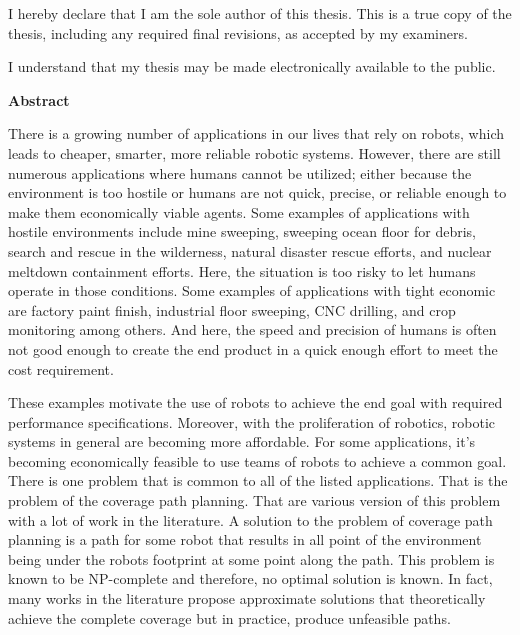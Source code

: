 \cleardoublepage %
 


  \noindent
I hereby declare that I am the sole author of this thesis. This is a true copy of the thesis, including any required final revisions, as accepted by my examiners.

  \bigskip
  
  \noindent
I understand that my thesis may be made electronically available to the public.

\cleardoublepage


\begin{center}\textbf{Abstract}\end{center}
There is a growing number of applications in our lives that rely on robots, which leads to cheaper, smarter, more reliable robotic systems. However, there are still numerous applications where humans cannot be utilized; either because the environment is too hostile or humans are not quick, precise, or reliable enough to make them economically viable agents. Some examples of applications with hostile environments include mine sweeping, sweeping ocean floor for debris, search and rescue in the wilderness, natural disaster rescue efforts, and nuclear meltdown containment efforts. Here, the situation is too risky to let humans operate in those conditions. Some examples of applications with tight economic are factory paint finish, industrial floor sweeping, CNC drilling, and crop monitoring among others. And here, the speed and precision of humans is often not good enough to create the end product in a quick enough effort to meet the cost requirement.

These examples motivate the use of robots to achieve the end goal with required performance specifications. Moreover, with the proliferation of robotics, robotic systems in general are becoming more affordable. For some applications, it's becoming economically feasible to use teams of robots to achieve a common goal. There is one problem that is common to all of the listed applications. That is the problem of the coverage path planning. That are various version of this problem with a lot of work in the literature. A solution to the problem of coverage path planning is a path for some robot that results in all point of the environment being under the robots footprint at some point along the path. This problem is known to be NP-complete and therefore, no optimal solution is known. In fact, many works in the literature propose approximate solutions that theoretically achieve the complete coverage but in practice, produce unfeasible paths.

